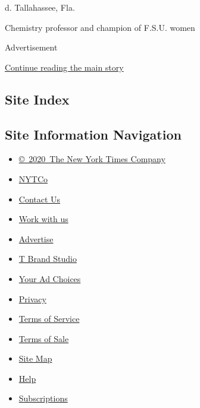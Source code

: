 d. Tallahassee, Fla.

Chemistry professor and champion of F.S.U. women

Advertisement

\protect\hyperlink{after-bottom}{Continue reading the main story}

\hypertarget{site-index}{%
\subsection{Site Index}\label{site-index}}

\hypertarget{site-information-navigation}{%
\subsection{Site Information
Navigation}\label{site-information-navigation}}

\begin{itemize}
\tightlist
\item
  \href{https://help.nytimes.com/hc/en-us/articles/115014792127-Copyright-notice}{©~2020~The
  New York Times Company}
\end{itemize}

\begin{itemize}
\tightlist
\item
  \href{https://www.nytco.com/}{NYTCo}
\item
  \href{https://help.nytimes.com/hc/en-us/articles/115015385887-Contact-Us}{Contact
  Us}
\item
  \href{https://www.nytco.com/careers/}{Work with us}
\item
  \href{https://nytmediakit.com/}{Advertise}
\item
  \href{http://www.tbrandstudio.com/}{T Brand Studio}
\item
  \href{https://www.nytimes.com/privacy/cookie-policy\#how-do-i-manage-trackers}{Your
  Ad Choices}
\item
  \href{https://www.nytimes.com/privacy}{Privacy}
\item
  \href{https://help.nytimes.com/hc/en-us/articles/115014893428-Terms-of-service}{Terms
  of Service}
\item
  \href{https://help.nytimes.com/hc/en-us/articles/115014893968-Terms-of-sale}{Terms
  of Sale}
\item
  \href{https://spiderbites.nytimes.com}{Site Map}
\item
  \href{https://help.nytimes.com/hc/en-us}{Help}
\item
  \href{https://www.nytimes.com/subscription?campaignId=37WXW}{Subscriptions}
\end{itemize}
